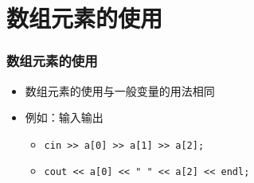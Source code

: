 \section{数组元素的使用}

\begin{frame}[fragile]
    \frametitle{数组元素的使用}

    \begin{itemize}
        \item 数组元素的使用与一般变量的用法相同

        \item 例如：输入输出

            \begin{itemize}
                \item \lstinline|cin >> a[0] >> a[1] >> a[2];|
                \item \lstinline|cout << a[0] << " " << a[2] << endl;|
            \end{itemize}

    \end{itemize}
\end{frame}

